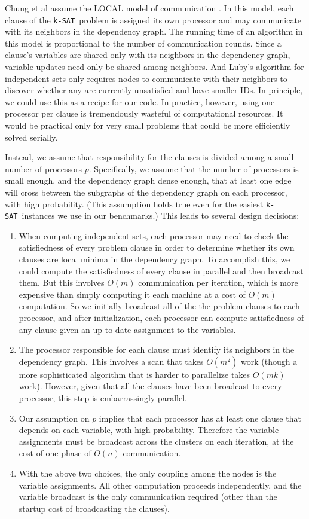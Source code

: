 \documentclass[twocolumn]{article}
\newcommand{\ksat}{\texttt{k-SAT}~}
\begin{document}
Chung et al assume the LOCAL model of communication \cite{peleg2000distributed}.  In this model, each clause of the \ksat problem is assigned its own processor and may communicate with its neighbors in the dependency graph.  The running time of an algorithm in this model is proportional to the number of communication rounds.  Since a clause's variables are shared only with its neighbors in the dependency graph, variable updates need only be shared among neighbors.  And Luby's algorithm for independent sets only requires nodes to communicate with their neighbors to discover whether any are currently unsatisfied and have smaller IDs.  In principle, we could use this as a recipe for our code.  In practice, however, using one processor per clause is tremendously wasteful of computational resources.  It would be practical only for very small problems that could be more efficiently solved serially.

Instead, we assume that responsibility for the clauses is divided among a small number of processors $p$.  Specifically, we assume that the number of processors is small enough, and the dependency graph dense enough, that at least one edge will cross between the subgraphs of the dependency graph on each processor, with high probability.  (This assumption holds true even for the easiest \ksat instances we use in our benchmarks.)  This leads to several design decisions:
\begin{enumerate}
  \item When computing independent sets, each processor may need to check the satisfiedness of every problem clause in order to determine whether its own clauses are local minima in the dependency graph.  To accomplish this, we could compute the satisfiedness of every clause in parallel and then broadcast them.  But this involves $O(m)$ communication per iteration, which is more expensive than simply computing it each machine at a cost of $O(m)$ computation.  So we initially broadcast all of the the problem clauses to each processor, and after initialization, each processor can compute satisfiedness of any clause given an up-to-date assignment to the variables.
  \item The processor responsible for each clause must identify its neighbors in the dependency graph.  This involves a scan that takes $O(m^2)$ work (though a more sophisticated algorithm that is harder to parallelize takes $O(m k)$ work).  However, given that all the clauses have been broadcast to every processor, this step is embarrassingly parallel.
  \item Our assumption on $p$ implies that each processor has at least one clause that depends on each variable, with high probability.  Therefore the variable assignments must be broadcast across the clusters on each iteration, at the cost of one phase of $O(n)$ communication.
  \item With the above two choices, the only coupling among the nodes is the variable assignments.  All other computation proceeds independently, and the variable broadcast is the only communication required (other than the startup cost of broadcasting the clauses).
\end{enumerate}
\end{document}
